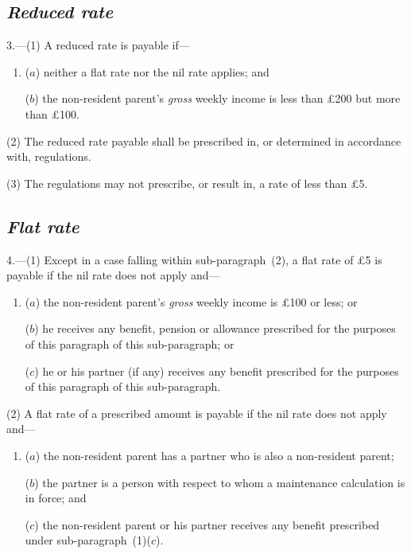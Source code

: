 \documentclass[12pt,a4paper]{article}
\begin{document}

\subsection*{\itshape Reduced rate}

3.---(1) A reduced rate is payable if—
\begin{enumerate}\item[]
($a$) neither a flat rate nor the nil rate applies; and

($b$) the non-resident parent’s 
\emph{gross}  %
weekly income is less than £200 but more than £100. 
\end{enumerate}

(2) The reduced rate payable shall be prescribed in, or determined in accordance with, regulations.

(3) The regulations may not prescribe, or result in, a rate of less than £5. 

\subsection*{\itshape Flat rate}

4.---(1) Except in a case falling within sub-paragraph~(2), a flat rate of £5 is payable if the nil rate does not apply and—
\begin{enumerate}\item[]
($a$) the non-resident parent’s 
\emph{gross}  %
weekly income is £100 or less; or

($b$) he receives any benefit, pension or allowance prescribed for the purposes of this paragraph of this sub-paragraph; or

($c$) he or his partner (if any) receives any benefit prescribed for the purposes of this paragraph of this sub-paragraph.
\end{enumerate}

(2) A flat rate of a prescribed amount is payable if the nil rate does not apply and—
\begin{enumerate}\item[]
($a$) the non-resident parent has a partner who is also a non-resident parent;

($b$) the partner is a person with respect to whom a maintenance calculation is in force; and

($c$) the non-resident parent or his partner receives any benefit prescribed under sub-paragraph~(1)($c$).
\end{enumerate}
\end{document}
